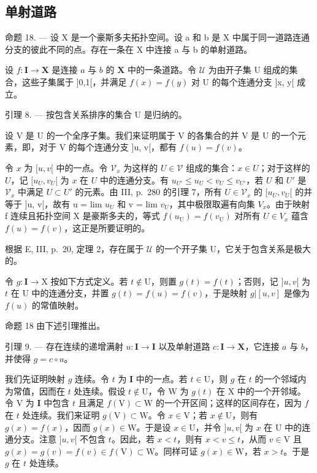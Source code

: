 \subsection{单射道路}

命题 18. --- 设 X 是一个豪斯多夫拓扑空间。设 a 和 b 是 X 中属于同一道路连通分支的彼此不同的点。存在一条在 X 中连接 a 与 b 的单射道路。

设 \(f \colon \mathbf{I} \to \mathbf{X}\) 是连接 \(a\) 与 \(b\) 的 \(\mathbf{X}\) 中的一条道路。令 \(\mathcal{U}\) 为由开子集 \(\mathrm{U}\) 组成的集合，这些子集属于 {]}0,1{[}，并满足 \(f(x) = f(y)\) 对 U 的每个连通分支 {]}x, y{[} 成立。

引理 8. --- 按包含关系排序的集合 U 是归纳的。

设 V 是 U 的一个全序子集。我们来证明属于 V 的各集合的并 V 是 U 的一个元素，即，对于 V 的每个连通分支 {]}u, v{[}，都有 \(f(u) = f(v)\)。

令 \(x\) 为 \([u, v[\) 中的一点。令 \(\mathcal{V}_x\) 为这样的 \(U \in \mathcal{V}\) 组成的集合：\(x \in U\)；对于这样的 \(U\)，记 \([u_U, v_U[\) 为 \(x\) 在 \(U\) 中的连通分支。有 \(u_{U'} \leqslant u_U < v_U \leqslant v_{U'}\)，若 \(U\) 和 \(U'\) 是 \(\mathcal{V}_x\) 中满足 \(U \subset U'\) 的元素。由 III, p.~280 的引理 7，所有 \(U \in \mathcal{V}_x\) 的 \([u_U, v_U[\) 的并等于 {]}u, v{[}，故有 u = lim \(u_{U}\) 和 v = lim \(v_{U}\)，其中极限取遍有向集 \(V_{x}\)。由于映射 f 连续且拓扑空间 X 是豪斯多夫的，等式 \(f(u_{\mathrm{U}}) = f(v_{\mathrm{U}})\) 对所有 \(U \in V_{x}\) 蕴含 \(f(u) = f(v)\)，这正是所要证明的。

根据 E, III, p.~20, 定理 2，存在属于 \(\mathcal{U}\) 的一个开子集 U，它关于包含关系是极大的。

令 \(g \colon \mathbf{I} \to \mathrm{X}\) 按如下方式定义。若 \(t \notin \mathrm{U}\)，则置 \(g(t) = f(t)\)；否则，记 \(]u, v[\) 为 \(t\) 在 \(\mathrm{U}\) 中的连通分支，并置 \(g(t) = f(u) = f(v)\)，于是映射 \(g|[u, v]\) 是像为 \(f(u)\) 的常值映射。

命题 18 由下述引理推出。

引理 9. --- 存在连续的递增满射 \(u\colon\mathbf{I}\to\mathbf{I}\) 以及单射道路 \(c\colon\mathbf{I}\to\mathbf{X}\)，它连接 \(a\) 与 \(b\)，并使得 \(g=c\circ u\)。

我们先证明映射 \(g\) 连续。令 \(t\) 为 \(\mathbf{I}\) 中的一点。若 \(t \in \mathrm{U}\)，则 \(g\) 在 \(t\) 的一个邻域内为常值，因而在 \(t\) 处连续。假设 \(t \notin \mathrm{U}\)，令 \(\mathrm{W}\) 为 \(g(t)\) 在 \(\mathrm{X}\) 中的一个开邻域。令 \(\mathrm{V}\) 为 \(\mathbf{I}\) 中包含 \(t\) 且满足 \(f(\mathrm{V}) \subset \mathrm{W}\) 的一个开区间；这样的区间存在，因为 \(f\) 在 \(t\) 处连续。我们来证明 \(g(\mathrm{V}) \subset \mathrm{W}\)。令 \(x \in \mathrm{V}\)；若 \(x \notin \mathrm{U}\)，则有 \(g(x) = f(x)\)，因而 \(g(x) \in \mathrm{W}\)。于是设 \(x \in \mathrm{U}\)，并令 \(]u, v[\) 为 \(x\) 在 \(\mathrm{U}\) 中的连通分支。注意 \(]u, v[\) 不包含 \(t\)。因此，若 \(x < t\)，则有 \(x < v \leqslant t\)，从而 \(v \in \mathrm{V}\) 且 \(g(x) = g(v) = f(v) \in f(\mathrm{V}) \subset \mathrm{W}\)。同样可证 \(g(x) \in \mathrm{W}\)，若 \(x > t\)。于是 \(g\) 在 \(t\) 处连续。

